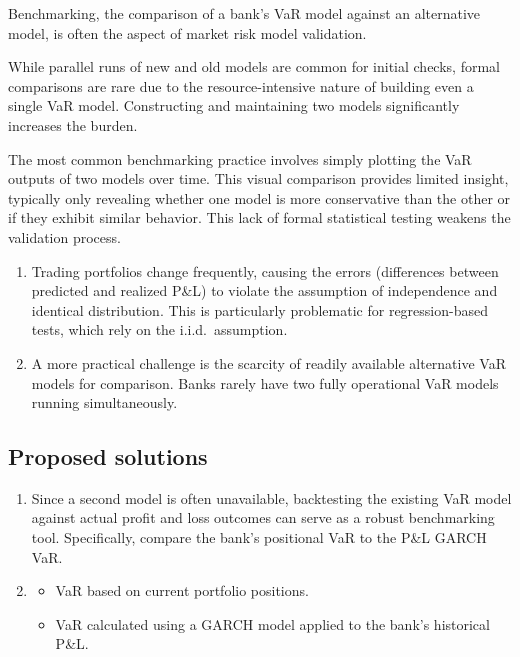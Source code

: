 
Benchmarking, the comparison of a bank's VaR model against an alternative model, is often the
 aspect of market risk model validation.

While parallel runs of new and old models are common for initial checks, formal comparisons are
rare due to the resource-intensive nature of building even a single VaR model. Constructing and
maintaining two models significantly increases the burden.

The most common benchmarking practice involves simply plotting the VaR outputs of two models
over time. This visual comparison provides limited insight, typically only revealing whether one
model is more conservative than the other or if they exhibit similar behavior. This lack of
formal statistical testing weakens the validation process.

\begin{mrtrapbox}[title={Issues with statistical tests that compare two VaR models}]
\begin{enumerate}
\item {} Trading portfolios change
      frequently, causing the errors (differences between predicted and realized P\&L) to
      violate the assumption of independence and identical distribution. This is particularly
      problematic for regression-based tests, which rely on the i.i.d.\ assumption.
\item {} A more practical challenge is the scarcity of
      readily available alternative VaR models for comparison. Banks rarely have two fully
      operational VaR models running simultaneously.
\end{enumerate}
\end{mrtrapbox}

\subsection{Proposed solutions}
\begin{enumerate}[label=\textbf{\alph*)}]
\item {} Since a second model is often unavailable, backtesting
      the existing VaR model against actual profit and loss outcomes can serve as a robust
      benchmarking tool. Specifically, compare the bank's positional VaR to the P\&L GARCH VaR.
\item {}
  \begin{itemize}
  \item {} VaR based on current portfolio positions.
  \item {} VaR calculated using a GARCH model applied to the bank's
        historical P\&L.
  \end{itemize}
\end{enumerate}

